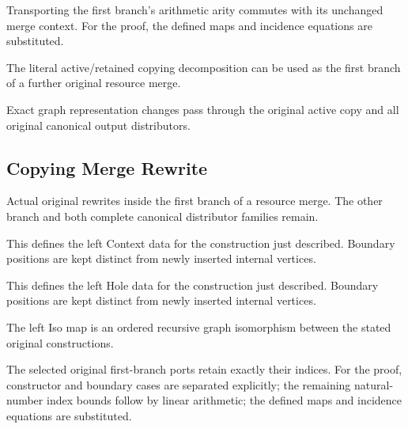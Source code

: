Transporting the first branch's arithmetic arity commutes with its unchanged merge context.
For the proof, the defined maps and incidence equations are substituted.
\par{}

The literal active/retained copying decomposition can be used as the first branch of a further original resource merge.
\par{}

Exact graph representation changes pass through the original active copy and all original canonical output distributors.
\par{}

\subsection{Copying Merge Rewrite}
Actual original rewrites inside the first branch of a resource merge. The other branch and both complete canonical distributor families remain.

This defines the left Context data for the construction just described. Boundary positions are kept distinct from newly inserted internal vertices.
\par{}

This defines the left Hole data for the construction just described. Boundary positions are kept distinct from newly inserted internal vertices.
\par{}

The left Iso map is an ordered recursive graph isomorphism between the stated original constructions.
\par{}

The selected original first-branch ports retain exactly their indices.
For the proof, constructor and boundary cases are separated explicitly; the remaining natural-number index bounds follow by linear arithmetic; the defined maps and incidence equations are substituted.
\par{}

